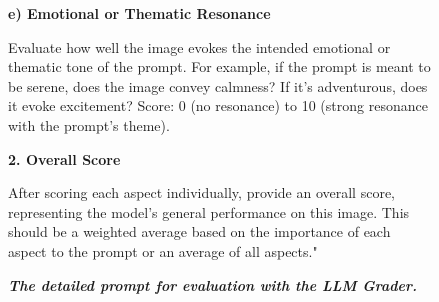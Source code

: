 \documentclass[11pt, letterpaper, logo]{googledeepmind}
\begin{document}
\begin{figure}[h!]
{\begin{minipage}{1.0\textwidth}
            \textbf{e) Emotional or Thematic Resonance}

            Evaluate how well the image evokes the intended emotional or thematic tone of the prompt. For example, if the prompt is meant to be serene, does the image convey calmness? If it’s adventurous, does it evoke excitement?
            Score: 0 (no resonance) to 10 (strong resonance with the prompt's theme).
            
            \textbf{2. Overall Score}

            After scoring each aspect individually, provide an overall score, representing the model's general performance on this image. This should be a weighted average based on the importance of each aspect to the prompt or an average of all aspects."
        \end{minipage}
    }
    \caption{\footnotesize{\textbf{\textit{The detailed prompt for evaluation with the LLM Grader.}}}}
    \label{fig:gemini-prompt}
\end{figure}


\clearpage



\end{document}

